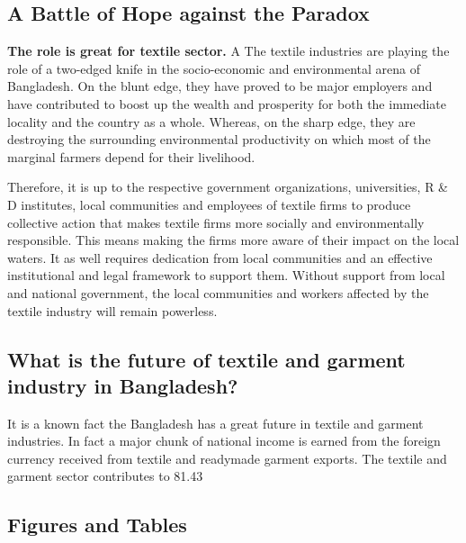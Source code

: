 \documentclass[conference]{IEEEtran}
\begin{document}
\subsection{A Battle of Hope against the Paradox}
\textbf{The role is great for textile sector.} A 
The textile industries are playing the role of a two-edged knife in the socio-economic and environmental arena of Bangladesh. On the blunt edge, they have proved to be major employers and have contributed to boost up the wealth and prosperity for both the immediate locality and the country as a whole. Whereas, on the sharp edge, they are destroying the surrounding environmental productivity on which most of the marginal farmers depend for their livelihood.

Therefore, it is up to the respective government organizations, universities, R & D institutes, local communities and employees of textile firms to produce collective action that makes textile firms more socially and environmentally responsible. This means making the firms more aware of their impact on the local waters. It as well requires dedication from local communities and an effective institutional and legal framework to support them. Without support from local and national government, the local communities and workers affected by the textile industry will remain powerless.

\subsection{What is the future of textile and garment industry in Bangladesh?}
It is a known fact the Bangladesh has a great future in textile and garment industries. In fact a major chunk of national income is earned from the foreign currency received from textile and readymade garment exports. The textile and garment sector contributes to 81.43%

\subsection{Figures and Tables}
\end{document}
